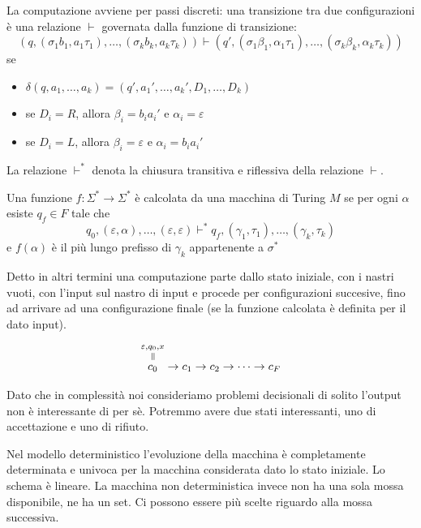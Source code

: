 La computazione avviene per passi discreti: una transizione tra due configurazioni è una relazione
$\vdash$ governata dalla funzione di transizione:
\begin{equation*}
    (q,(\sigma_{1}b_{1},a_{1}\tau_{1}),\dotsc,(\sigma_{k}b_{k},a_{k}\tau_{k})) \vdash
    (q',(\sigma_{1}\beta_{1},\alpha_{1}\tau_{1}),\dotsc,(\sigma_{k}\beta_{k},\alpha_{k}\tau_{k}))
\end{equation*}
se
\begin{itemize}
    \item $\delta(q,a_{1},\dotsc,a_{k}) = (q',a_{1}',\dotsc,a_{k}',D_{1},\dotsc,D_{k})$
    \item se $D_{i} = R$, allora $\beta_{i} = b_{i}a_{i}'$ e $\alpha_{i} = \varepsilon$
    \item se $D_{i} = L$, allora $\beta_{i} = \varepsilon$ e $\alpha_{i} = b_{i}a_{i}'$
\end{itemize}

La relazione $\vdash^{*}$ denota la chiusura transitiva e riflessiva della relazione $\vdash$.

\begin{defn}
    Una funzione $f: \Sigma^{*} \to \Sigma^{*}$ è calcolata da una macchina di Turing $M$ se per
    ogni $\alpha$ esiste $q_{f} \in F$ tale che
    \begin{equation*}
        q_{0}, (\varepsilon,\alpha),\dotsc,(\varepsilon,\varepsilon) \vdash^{*} q_{f},
        (\gamma_{1},\tau_{1}),\dotsc,(\gamma_{k},\tau_{k})
    \end{equation*}
    e $f(\alpha)$ è il più lungo prefisso di $\gamma_{k}$ appartenente a $\sigma^{*}$
\end{defn}

Detto in altri termini una computazione parte dallo stato iniziale, con i nastri vuoti, con l'input
sul nastro di input e procede per configurazioni succesive, fino ad arrivare ad una configurazione
finale (se la funzione calcolata è definita per il dato input).

\begin{equation*}
    \overequalto{c_{0}}{\varepsilon,q_{0},x} \to c_{1} \to c_{2} \to \cdots \to c_{F}
\end{equation*}

Dato che in complessità noi consideriamo problemi decisionali di solito l'output non è
interessante di per sè. Potremmo avere due stati interessanti, uno di accettazione e uno di
rifiuto.

Nel modello deterministico l'evoluzione della macchina è completamente determinata e univoca per la
macchina considerata dato lo stato iniziale. Lo schema è lineare. La macchina non deterministica
invece non ha una sola mossa disponibile, ne ha un set. Ci possono essere più scelte riguardo alla
mossa successiva.

